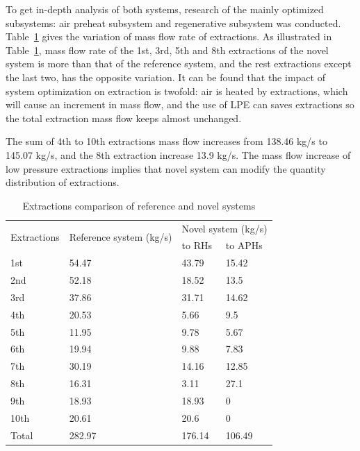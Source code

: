 \documentclass[preprint,12pt]{elsarticle}
\begin{document}

To get in-depth analysis of both systems, research of the mainly optimized subsystems: air preheat subsystem and regenerative subsystem was conducted.
Table~\ref{table:extraction_compare} gives the variation of mass flow rate of extractions.
As illustrated in Table~\ref{table:extraction_compare}, mass flow rate of the 1st, 3rd, 5th and 8th extractions of the novel system is more than that of the reference system, and the rest extractions except the last two, has the opposite variation. 
It can be found that the impact of system optimization on extraction is twofold: air is heated by extractions, which will cause an increment in mass flow, and the use of LPE can saves extractions so the total extraction mass flow keeps almost unchanged.

The sum of 4th to 10th extractions mass flow increases from 138.46 kg/s to 145.07 kg/s, and the 8th extraction increase 13.9 kg/s.
The mass flow increase of low pressure extractions implies that novel system can modify the quantity distribution of extractions.

\begin{table}
\caption{Extractions comparison of reference and novel systems}
\label{table:extraction_compare}
\begin{centering}
\begin{tabular}{llll}
\toprule 
\multirow{2}{*}{Extractions} & \multirow{2}{2.5cm}{Reference system (kg/s)} & \multicolumn{2}{c}{Novel system (kg/s)}\tabularnewline
\cmidrule{3-4} 
 &  & to RHs & to APHs\tabularnewline
\midrule
1st & 54.47 & 43.79 & 15.42\tabularnewline
2nd & 52.18 & 18.52 & 13.5\tabularnewline
3rd & 37.86 & 31.71 & 14.62\tabularnewline
4th & 20.53 & 5.66 & 9.5\tabularnewline
5th & 11.95 & 9.78 & 5.67\tabularnewline
6th & 19.94 & 9.88 & 7.83\tabularnewline
7th & 30.19 & 14.16 & 12.85\tabularnewline
8th & 16.31 & 3.11 & 27.1\tabularnewline
9th & 18.93 & 18.93 & 0\tabularnewline
10th & 20.61 & 20.6 & 0\tabularnewline
Total & 282.97 & 176.14 & 106.49\tabularnewline
\bottomrule
\end{tabular}
\par\end{centering}
\end{table}
\end{document}
